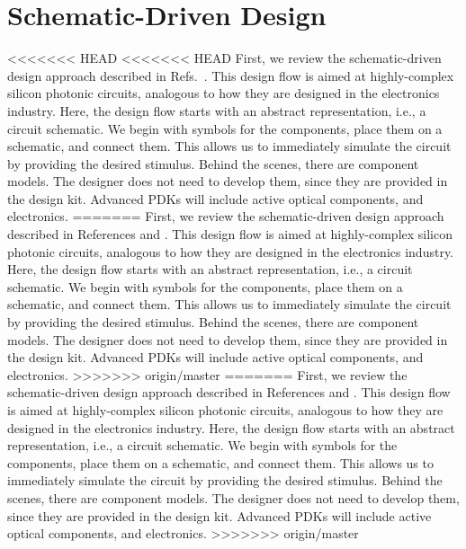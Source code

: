 \documentclass[journal]{spie}
\begin{document}
\section{Schematic-Driven Design}

<<<<<<< HEAD
<<<<<<< HEAD
First, we review the schematic-driven design approach described in Refs.~.   This design flow is aimed at highly-complex silicon photonic circuits, analogous to how they are designed in the electronics industry.  Here, the design flow starts with an abstract representation, i.e., a circuit schematic.  We begin with symbols for the components,  place them on a schematic, and connect them.   This allows us to immediately simulate the circuit by providing the desired stimulus.  Behind the scenes, there are component models.  The designer does not need to develop them, since they are provided in the design kit.  Advanced PDKs will include active optical components, and electronics.  
=======
First, we review the schematic-driven design approach described in References  and .   This design flow is aimed at highly-complex silicon photonic circuits, analogous to how they are designed in the electronics industry.  Here, the design flow starts with an abstract representation, i.e., a circuit schematic.  We begin with symbols for the components,  place them on a schematic, and connect them.   This allows us to immediately simulate the circuit by providing the desired stimulus.  Behind the scenes, there are component models.  The designer does not need to develop them, since they are provided in the design kit.  Advanced PDKs will include active optical components, and electronics.  
>>>>>>> origin/master
=======
First, we review the schematic-driven design approach described in References  and .   This design flow is aimed at highly-complex silicon photonic circuits, analogous to how they are designed in the electronics industry.  Here, the design flow starts with an abstract representation, i.e., a circuit schematic.  We begin with symbols for the components,  place them on a schematic, and connect them.   This allows us to immediately simulate the circuit by providing the desired stimulus.  Behind the scenes, there are component models.  The designer does not need to develop them, since they are provided in the design kit.  Advanced PDKs will include active optical components, and electronics.  
>>>>>>> origin/master
\end{document}
